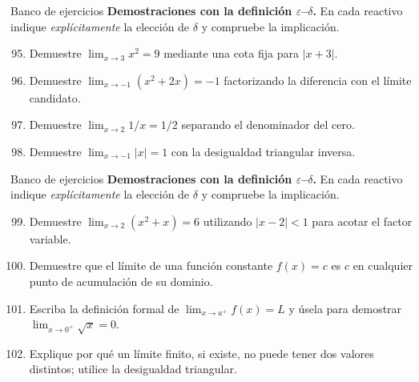 \documentclass[12pt,aspectratio=169]{beamer}
\begin{document}
\begin{frame}[t,allowframebreaks]{Banco de ejercicios}
\small
\noindent \textbf{Demostraciones con la definición $\varepsilon$--$\delta$.} En cada reactivo indique \emph{explícitamente} la elección de $\delta$ y compruebe la implicación.\par\smallskip
\begin{enumerate}\setcounter{enumi}{94}
\item Demuestre $\lim_{x\to3}x^2=9$ mediante una cota fija para $|x+3|$.
\item Demuestre $\lim_{x\to-1}(x^2+2x)=-1$ factorizando la diferencia con el límite candidato.
\item Demuestre $\lim_{x\to2}1/x=1/2$ separando el denominador del cero.
\item Demuestre $\lim_{x\to-1}|x|=1$ con la desigualdad triangular inversa.
\end{enumerate}
\end{frame}


\begin{frame}[t,allowframebreaks]{Banco de ejercicios}
\small
\noindent \textbf{Demostraciones con la definición $\varepsilon$--$\delta$.} En cada reactivo indique \emph{explícitamente} la elección de $\delta$ y compruebe la implicación.\par\smallskip
\begin{enumerate}\setcounter{enumi}{98}
\item Demuestre $\lim_{x\to2}(x^2+x)=6$ utilizando $|x-2|<1$ para acotar el factor variable.
\item Demuestre que el límite de una función constante $f(x)=c$ es $c$ en cualquier punto de acumulación de su dominio.
\item Escriba la definición formal de $\lim_{x\to a^+}f(x)=L$ y úsela para demostrar $\lim_{x\to0^+}\sqrt{x}=0$.
\item Explique por qué un límite finito, si existe, no puede tener dos valores distintos; utilice la desigualdad triangular.
\end{enumerate}
\end{frame}
\end{document}
